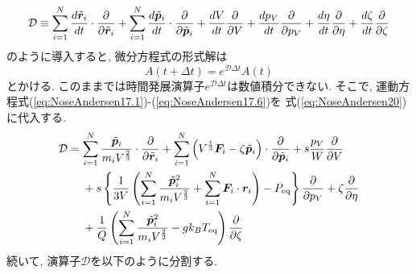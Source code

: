 \begin{equation}
 \mathcal{D}
  \equiv
  \sum_{i=1}^{N} \frac{d \Tilde{\bm{r}}_{i}}{d t} \cdot \frac{\partial}{\partial \Tilde{\bm{r}}_{i}}
  +
  \sum_{i=1}^{N} \frac{d \Tilde{\bm{p}}_{i}}{d t} \cdot \frac{\partial}{\partial \Tilde{\bm{p}}_{i}}
  +
  \frac{d V}{d t} \frac{\partial}{\partial V}
  +
  \frac{d p_{V}}{d t} \frac{\partial}{\partial p_{V}}
  +
  \frac{d \eta}{d t} \frac{\partial}{\partial \eta}
  +
  \frac{d \zeta}{d t} \frac{\partial}{\partial \zeta}
 \label{eq:NoseAndersen20}
\end{equation}
のように導入すると, 微分方程式の形式解は
\begin{equation}
 A(t + \Delta t) = e^{\mathcal{D} \Delta t} A(t)
\end{equation}
とかける. 
このままでは時間発展演算子$e^{\mathcal{D} \Delta t}$は数値積分できない. 
そこで, 運動方程式(\ref{eq:NoseAndersen17.1})-(\ref{eq:NoseAndersen17.6})を
式(\ref{eq:NoseAndersen20})に代入する. 
\begin{align}
 \mathcal{D}
 &=
  \sum_{i=1}^{N} \frac{\Tilde{\bm{p}}_{i}}{ m_{i} V^{\frac{2}{3}}}
  \cdot \frac{\partial}{\partial \Tilde{\bm{r}}_{i}}
  +
  \sum_{i=1}^{N}
  \left(
   V^{\frac{1}{3}} \bm{F}_{i} - \zeta \Tilde{\bm{p}}_{i}
  \right)
  \cdot \frac{\partial}{\partial \Tilde{\bm{p}}_{i}}
  +
  s \frac{p_{V}}{W} \frac{\partial}{\partial V} 
  \notag
  \\ 
  &~~~~
  +
  s \left\{
     \frac{1}{3V} \left(
		   \sum_{i=1}^{N} \frac{\Tilde{\bm{p}}_{i}^{2}}{m_{i} V^{\frac{2}{3}}}
		   + \sum_{i=1}^{N} \bm{F}_{i} \cdot \bm{r}_{i}
		  \right)
     - P_{\mathrm{eq}}
    \right\}
  \frac{\partial}{\partial p_{V}}
  +
  \zeta \frac{\partial}{\partial \eta}
  \notag
  \\ &~~~~
  +
  \frac{1}{Q} \left(
                    \sum_{i=1}^{N} \frac{\Tilde{\bm{p}}_{i}^{2}}{m_{i} V^{\frac{2}{3}}}
                   - g k_{B} T_{\mathrm{eq}}
	       \right)
  \frac{\partial}{\partial \zeta}
 \label{eq:NoseAndersen21}
\end{align}
続いて, 演算子$\mathcal{D}$を以下のように分割する. 
